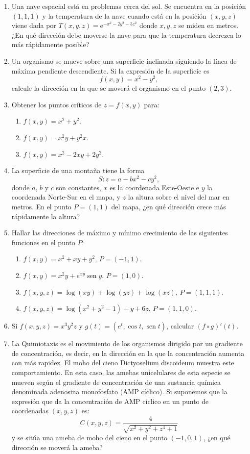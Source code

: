 \documentclass[a4paper,titlepage]{article}
\DeclareMathOperator{\sen}{sen}
\theoremstyle{solution}
\begin{document}
\begin{enumerate}[resume, leftmargin=*]
\item Una nave espacial está en problemas cerca del sol.
Se encuentra en la posición $(1,1,1)$ y la temperatura de la nave cuando está en la posición $(x,y,z)$ viene dada por
$T(x,y,z)=\mbox{e}^{-x^2-2y^2-3z^2}$ donde $x,y,z$ se miden en metros.
¿En qué dirección debe moverse la nave para que la temperatura decrezca lo más rápidamente posible?

\item Un organismo se mueve sobre una superficie inclinada siguiendo la línea de máxima pendiente descendiente. 
Si la expresión de la superficie es 
\[
f(x,y) = x^2-y^2,
\]
calcule la dirección en la que se moverá el organismo en el punto $(2,3)$.

\item Obtener los puntos críticos de $z=f(x,y)$ para:
\begin{enumerate}
\item $f(x,y)=x^2+y^2$.
\item $f(x,y)=x^2y+y^2x$.
\item $f(x,y)=x^2-2xy+2y^2$.
\end{enumerate}

\item La superficie de una montaña tiene la forma
\[
S:z=a-bx^2-cy^2,
\]
donde $a$, $b$ y $c$ son constantes, $x$ es la coordenada Este-Oeste e $y$ la coordenada Norte-Sur en el mapa, y $z$ la altura sobre el nivel del mar en metros. 
En el punto $P=(1,1)$ del mapa, ¿en qué dirección crece más rápidamente la altura?

\item Hallar las direcciones de máximo y mínimo crecimiento de las siguientes funciones en el punto $P$:
\begin{enumerate}
\item $f(x,y)=x^2+xy+y^2$, $P=(-1,1)$.
\item $f(x,y)=x^2y+e^{xy}\sen y$, $P=(1,0)$.
\item $f(x,y,z)=\log(xy)+\log(yz)+\log(xz)$, $P=(1,1,1)$.
\item $f(x,y,z)=\log(x^2+y^2-1)+y+6z$, $P=(1,1,0)$.
\end{enumerate}

\item Si $f(x,y,z)=x^3y^2z$ y $g(t)=(e^t,\cos t,\sen t)$, calcular $(f\circ g)'(t)$.

\item La Quimiotaxis es el movimiento de los organismos dirigido por un gradiente de concentración, es decir, en la dirección
en la que la concentración aumenta con más rapidez. El moho del cieno Dictyoselium discoideum muestra este
comportamiento. En esta caso, las amebas unicelulares de esta especie se mueven según el gradiente de concentración de
una sustancia química denominada adenosina monofosfato (AMP cíclico). Si suponemos que la expresión que da la
concentración de AMP cíclico en un punto de coordenadas $(x,y,z)$ es:
\[
C(x,y,z) = \frac{4} {{\sqrt {x^2  + y^2  + z^4  + 1} }}
\]
y se sitúa una ameba de moho del cieno en el punto $(-1,0,1)$, ¿en qué dirección se moverá la ameba?


\end{enumerate}
\end{document}
